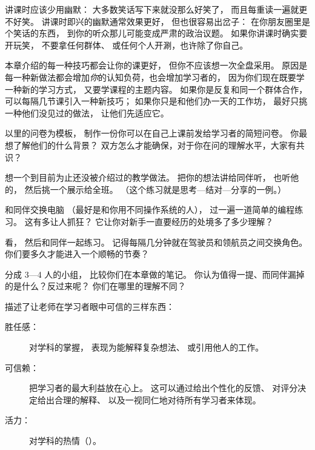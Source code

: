 讲课时应该少用幽默：
大多数笑话写下来就没那么好笑了，
而且每重读一遍就更不好笑。
讲课时即兴的幽默通常效果更好，
但也很容易出岔子：
在你朋友圈里是个笑话的东西，
到你的听众那儿可能变成严肃的政治议题。
如果你讲课时确实要开玩笑，
不要拿任何群体、
或任何个人开涮，也许除了你自己。


本章介绍的每一种技巧都会让你的课更好，
但你不应该想一次全盘采用。
原因是每一种新做法都会增加\emph{你}的认知负荷，也会增加学习者的，
因为你们现在既要学一种新的学习方式，
又要学课程的主题内容。
如果你是反复和同一个群体合作，
可以每隔几节课引入一种新技巧；
如果你只是和他们办一天的工作坊，
最好只挑一种他们没见过的做法，
让他们先适应它。



以里的问卷为模板，
制作一份你可以在自己上课前发给学习者的简短问卷。
你最想了解他们的什么背景？
双方怎么才能确保，对于你在问的理解水平，大家有共识？


想一个到目前为止还没被介绍过的教学做法。
把你的想法讲给同伴听，
也听他的，
然后挑一个展示给全班。
（这个练习就是思考—结对—分享的一例。）


和同伴交换电脑
（最好是和你用不同操作系统的人），
过一遍一道简单的编程练习。
这有多让人抓狂？
它让你对新手一直要经历的处境多了多少理解？


看，
然后和同伴一起练习。
记得每隔几分钟就在驾驶员和领航员之间交换角色。
你们要多久才能进入一个顺畅的节奏？


分成 3—4 人的小组，
比较你们在本章做的笔记。
你认为值得一提、而同伴漏掉的是什么？反过来呢？
你们在哪里的理解不同？


\cite{Fink2013}描述了让老师在学习者眼中可信的三样东西：

\begin{description}

\item[胜任感：]
  对学科的掌握，
  表现为能解释复杂想法、
  或引用他人的工作。

\item[可信赖：]
  把学习者的最大利益放在心上。
  这可以通过给出个性化的反馈、
  对评分决定给出合理的解释、
  以及一视同仁地对待所有学习者来体现。

\item[活力：]
  对学科的热情（）。

\end{description}

